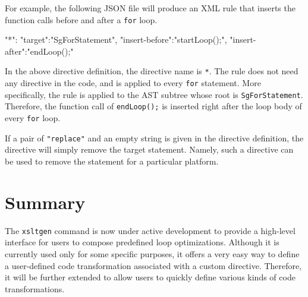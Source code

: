 For example, the following JSON file will produce an XML rule that
inserts the function calls before and after a \texttt{for} loop.
\begin{framed}
\begin{src}
{
  "*":{
    "target":"SgForStatement",
    "insert-before":"startLoop();",
    "insert-after":"endLoop();"
  }
}
\end{src}
\end{framed}
In the above directive definition, the directive name is \texttt{*}. The
rule does not need any directive in the code, and is applied to every
\texttt{for} statement. More specifically, the rule is applied to the
AST subtree whose root is \texttt{SgForStatement}. Therefore, the
function call of \texttt{endLoop();} is inserted right after the loop
body of every \texttt{for} loop.

If a pair of \texttt{"replace"} and an empty string is given in the
directive definition, the directive will simply remove the target
statement. Namely, such a directive can be used to remove the statement
for a particular platform.


\section{Summary}
The \texttt{xsltgen} command is now under active development to provide
a high-level interface for users to compose predefined loop
optimizations.  Although it is currently used only for some specific
purposes, it offers a very easy way to define a user-defined code
transformation associated with a custom directive. Therefore, it will be
further extended to allow users to quickly define various kinds of code
transformations.
